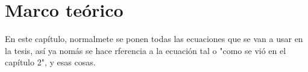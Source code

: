 

\chapter{Marco teórico}

En este capítulo, normalmete se ponen todas las ecuaciones que se van a usar en la tesis, así ya nomás se hace rferencia a la ecuación tal o "como se vió en el capítulo 2", y esas cosas.

\blindtext
